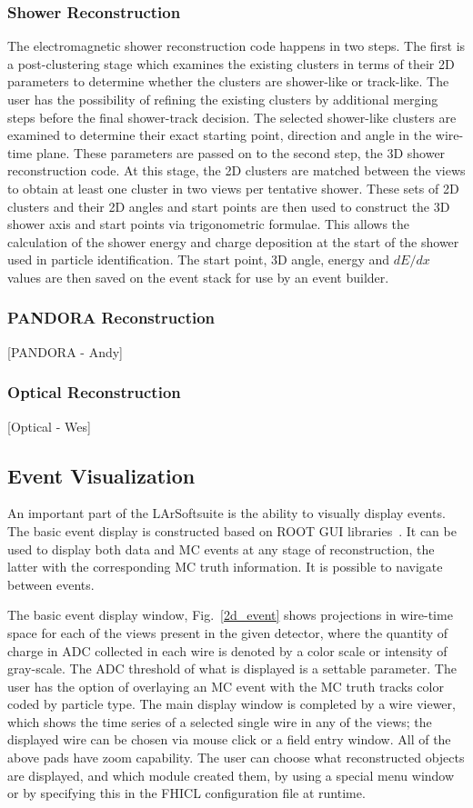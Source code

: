\documentclass[12pt]{elsarticle}
\newcommand{\larsoft}{LArSoft}
\begin{document}
\subsubsection{Shower Reconstruction}

The electromagnetic shower reconstruction code happens in two steps. The first is a post-clustering stage which examines the existing clusters in terms of their 2D parameters to determine whether the clusters are shower-like or track-like. The user has the possibility of refining the existing clusters by additional merging steps before the final shower-track decision. The selected shower-like clusters are examined to determine their exact starting point, direction and angle in the wire-time plane. These parameters are passed on to the second step, the 3D shower reconstruction code. At this stage, the 2D clusters are matched between the views to obtain at least one cluster in two views per tentative shower. These sets of 2D clusters and their 2D angles and start points are then used to construct the 3D shower axis and start points via trigonometric formulae. This allows the calculation of the shower energy and charge deposition at the start of the shower used in particle identification. The start point, 3D angle, energy and $dE/dx$ values are then saved on the event stack for use by an event builder.

\subsubsection{PANDORA Reconstruction}
[PANDORA - Andy]
\subsubsection{Optical Reconstruction}
[Optical - Wes]

\subsection{Event Visualization}
An important part of the \larsoft suite is the ability to visually display events. The basic event display is constructed based on ROOT GUI libraries~\cite{ROOT}.
It can be used to display both data and MC events at any stage of reconstruction, the latter with the corresponding MC truth information. It is possible to navigate between events.

The basic event display window, Fig.~\ref{2d_event} shows projections in wire-time space for each of the views present in the given detector, where the quantity of charge in ADC collected in each wire is denoted by a color scale or intensity of gray-scale. The ADC threshold of what is displayed is a settable parameter. 
The user has the option of overlaying an MC event with the MC truth tracks color coded by particle type. The main display window is completed by a wire viewer, which shows the time series of a selected single wire in any of the views; the displayed wire can be chosen via mouse click or a field entry window.
All of the above pads have zoom capability. The user can choose what reconstructed objects are displayed, and which module created them, by using a special menu window or by specifying this in the FHICL configuration file at runtime. 
\end{document}
